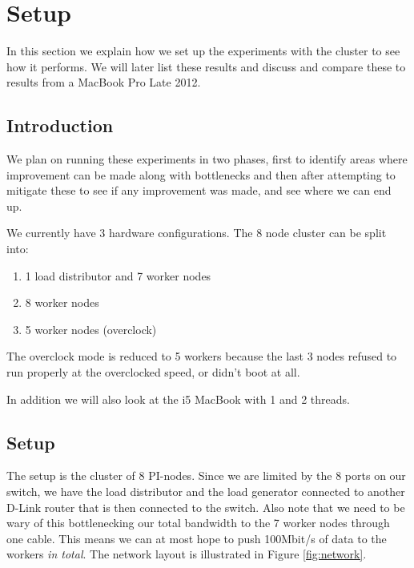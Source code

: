 \clearpage

\section{Setup}
\label{sec:setup}

In this section we explain how we set up the experiments with the cluster to see how it performs. We will later list these results and discuss and compare these to results from a MacBook Pro Late 2012.

\subsection{Introduction}
We plan on running these experiments in two phases, first to identify areas where improvement can be made along with bottlenecks and then after attempting to mitigate these to see if any improvement was made, and see where we can end up.

We currently have 3 hardware configurations. The 8 node cluster can be split into:

\begin{enumerate}
\item 1 load distributor and 7 worker nodes
\item 8 worker nodes
\item 5 worker nodes (overclock)
\end{enumerate}

The overclock mode is reduced to 5 workers because the last 3 nodes refused to run properly at the overclocked speed, or didn't boot at all.

In addition we will also look at the i5 MacBook with 1 and 2 threads.

\subsection{Setup}
The setup is the cluster of 8 PI-nodes. Since we are limited by the 8 ports on our switch, we have the load distributor and the load generator connected to another D-Link router that is then connected to the switch.
Also note that we need to be wary of this bottlenecking our total bandwidth to the 7 worker nodes through one cable.
This means we can at most hope to push 100Mbit/s of data to the workers {\em in total}.
The network layout is illustrated in Figure \ref{fig:network}.

